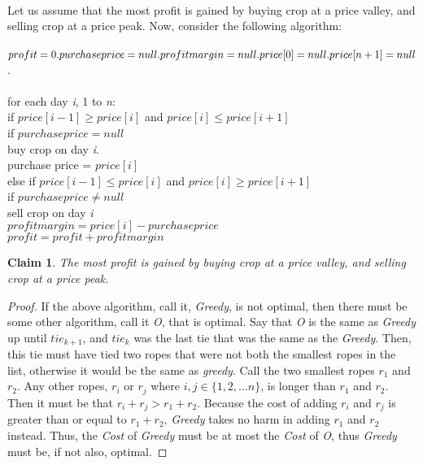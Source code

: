 \documentclass[11pt]{article}
\newtheorem{claim}[theorem]{Claim}
\begin{document}
		\\
		Let us assume that the most profit is gained by buying crop at a price valley, and selling crop at a price peak. Now, consider the following algorithm:\\
		\\
		$profit = 0.\\
		purchase price = null.\\
		profit margin = null.
		price[0] = null.\\
		price[n+1] = null$.\\
		\\
		for each day \textit{i}, 1 to \textit{n}:\\
		\indent  if $price[i-1] \geq price[i]$ and $price[i] \leq price[i+1]$\\
		\indent \indent if $purchase price = null$\\
		\indent \indent \indent buy crop on day \textit{i}.\\
		\indent \indent \indent purchase price = $price[i]$\\
		\indent else if $price[i-1] \leq price[i]$ and $price[i] \geq price[i+1]$\\
		\indent \indent if $purchase price \neq null$ \\
		\indent \indent \indent sell crop on day \textit{i} \\
		\indent \indent \indent $profit margin = price[i] - purchase price$ \\
		\indent \indent \indent $profit = profit + profit margin$ \\
		

	\begin{claim} 
		The most profit is gained by buying crop at a price valley, and selling crop at a price peak. 
	\end{claim}

	\begin{proof}
		If the above algorithm, call it, \textit{Greedy}, is not optimal,
		then there must be some other algorithm, call it \textit{O}, that is optimal. 
		Say that \textit{O} is the same as \textit{Greedy} up until $tie_{k+1}$, and $tie_k$ was the last tie that was the same as the \textit{Greedy}. Then, this tie must have tied two ropes that were not both the smallest ropes in the list, otherwise it would be the same as \textit{greedy}. Call the two smallest ropes $r_1$ and $r_2$. Any other ropes, $r_i$ or $r_j$ where $i, j \in \{1, 2, ... n\}$, is longer than $r_1$ and $r_2$. Then it must be that $r_i + r_j > r_1 + r_2$. Because the cost of adding $r_i$ and $r_j$ is greater than or equal to $r_1 + r_2$, \textit{Greedy} takes no harm in adding $r_1$ and $r_2$ instead. Thus, the \textit{Cost} of \textit{Greedy} must be at most the \textit{Cost} of \textit{O}, thus \textit{Greedy} must be, if not also, optimal. 
	\end{proof}
\end{document}
